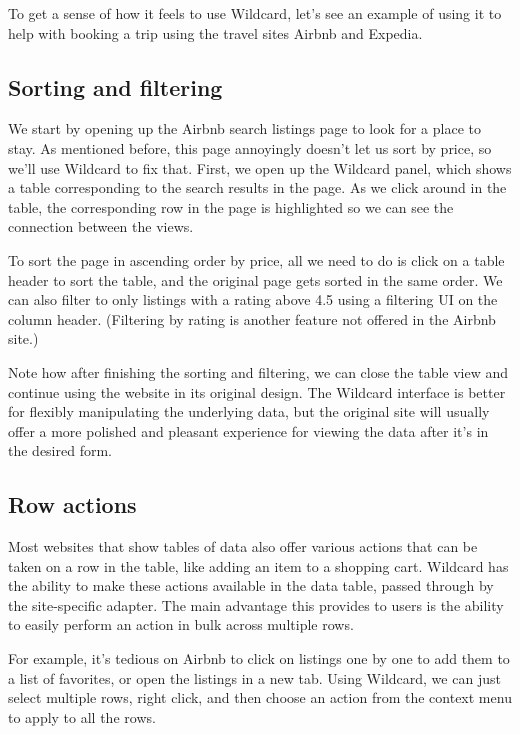 \documentclass[english,submission]{programming}
\begin{document}
To get a sense of how it feels to use Wildcard, let's see an example of
using it to help with booking a trip using the travel sites Airbnb and
Expedia.

\hypertarget{sorting-and-filtering}{%
\subsection{Sorting and filtering}\label{sorting-and-filtering}}

We start by opening up the Airbnb search listings page to look for a
place to stay. As mentioned before, this page annoyingly doesn't let us
sort by price, so we'll use Wildcard to fix that. First, we open up the
Wildcard panel, which shows a table corresponding to the search results
in the page. As we click around in the table, the corresponding row in
the page is highlighted so we can see the connection between the views.

To sort the page in ascending order by price, all we need to do is click
on a table header to sort the table, and the original page gets sorted
in the same order. We can also filter to only listings with a rating
above 4.5 using a filtering UI on the column header. (Filtering by
rating is another feature not offered in the Airbnb site.)

Note how after finishing the sorting and filtering, we can close the
table view and continue using the website in its original design. The
Wildcard interface is better for flexibly manipulating the underlying
data, but the original site will usually offer a more polished and
pleasant experience for viewing the data after it's in the desired form.

\hypertarget{row-actions}{%
\subsection{Row actions}\label{row-actions}}

Most websites that show tables of data also offer various actions that
can be taken on a row in the table, like adding an item to a shopping
cart. Wildcard has the ability to make these actions available in the
data table, passed through by the site-specific adapter. The main
advantage this provides to users is the ability to easily perform an
action in bulk across multiple rows.

For example, it's tedious on Airbnb to click on listings one by one to
add them to a list of favorites, or open the listings in a new tab.
Using Wildcard, we can just select multiple rows, right click, and then
choose an action from the context menu to apply to all the rows.
\end{document}
